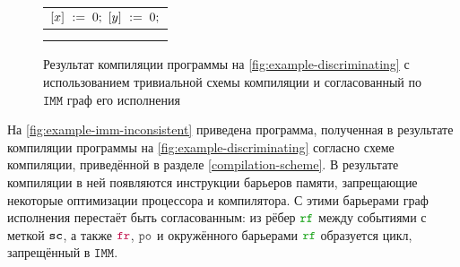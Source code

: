 \documentclass[14pt]{matmex-diploma-custom}
\newcommand{\IMM}{\mathtt{IMM}}
\begin{document}
\begin{figure}[h]
  \centering
  \begin{minipage}{0.45\textwidth}
    \centering
    \begin{tabular}{L || L || L}
       \\
      \hline
       &  &  \\
      {}            &  &  \\
    \end{tabular}
  \end{minipage}\hfill
  \begin{minipage}{0.45\textwidth}
    \centering
  \end{minipage}
  \caption{Результат компиляции программы на \cref{fig:example-discriminating} с использованием тривиальной схемы компиляции и согласованный по $\IMM$ граф его исполнения}
  \label{fig:example-imm-consistent}
\end{figure}

На \cref{fig:example-imm-inconsistent} приведена программа, полученная в результате компиляции программы на \cref{fig:example-discriminating} согласно схеме компиляции, приведённой в разделе \ref{compilation-scheme}. В результате компиляции в ней появляются инструкции барьеров памяти, запрещающие некоторые оптимизации процессора и компилятора. С этими барьерами граф исполнения перестаёт быть согласованным: из рёбер $\lRF$ между событиями с меткой ${\mathtt{sc}}$, а также $\lFR$, $\lPO$ и окружённого барьерами $\lRF$ образуется цикл, запрещённый в $\IMM$.


\newcommand{\vsIV}{-1.2}
\newcommand{\hsIV}{2.2}
\end{document}
